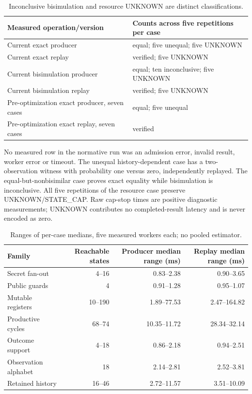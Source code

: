 \documentclass[11pt,a4paper]{article}
\begin{document}
\begin{table}[h]
\small
\begin{tabularx}{\textwidth}{@{}>{\raggedright\arraybackslash}p{5.4cm} >{\raggedright\arraybackslash}X@{}}
\toprule
Measured operation/version & Counts across five repetitions per case \\
\midrule
Current exact producer & 125 equal; five unequal; five UNKNOWN \\
Current exact replay & 130 verified; five UNKNOWN \\
Current bisimulation producer & 120 equal; ten inconclusive; five UNKNOWN \\
Current bisimulation replay & 130 verified; five UNKNOWN \\
Pre-optimization exact producer, seven cases & 30 equal; five unequal \\
Pre-optimization exact replay, seven cases & 35 verified \\
\bottomrule
\end{tabularx}
\caption{Inconclusive bisimulation and resource UNKNOWN are distinct classifications.}
\end{table}

No measured row in the normative run was an admission error, invalid result, worker error or timeout. The unequal history-dependent case has a two-observation witness with probability one versus zero, independently replayed. The equal-but-nonbisimilar case proves exact equality while bisimulation is inconclusive. All five repetitions of the resource case preserve UNKNOWN/STATE\_CAP. Raw cap-stop times are positive diagnostic measurements; UNKNOWN contributes no completed-result latency and is never encoded as zero.

\begin{table}[h]
\small
\begin{tabular}{@{}l r r r@{}}
\toprule
Family & Reachable states & Producer median range (ms) & Replay median range (ms) \\
\midrule
Secret fan-out & 4--16 & 0.83--2.38 & 0.90--3.65 \\
Public guards & 4 & 0.91--1.28 & 0.95--1.07 \\
Mutable registers & 10--190 & 1.89--77.53 & 2.47--164.82 \\
Productive cycles & 68--74 & 10.35--11.72 & 28.34--32.14 \\
Outcome support & 4--18 & 0.86--2.18 & 0.94--2.51 \\
Observation alphabet & 18 & 2.14--2.81 & 2.52--3.81 \\
Retained history & 16--46 & 2.72--11.57 & 3.51--10.09 \\
\bottomrule
\end{tabular}
\caption{Ranges of per-case medians, five measured workers each; no pooled estimator.}
\end{table}
\end{document}
